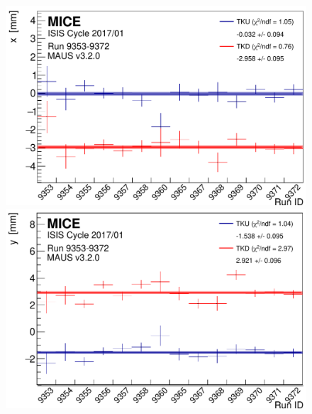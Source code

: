 \begin{figure}[htb]
  \begin{center}
    \begin{minipage}[b]{.45\textwidth}
      \begin{center}
        \includegraphics[width=\textwidth]{data_final/x_bestfit-edit.pdf}
      \end{center}
    \end{minipage}
    \hfill
    \begin{minipage}[b]{.45\textwidth}
      \begin{center}
        \includegraphics[width=\textwidth]{data_final/y_bestfit-edit.pdf}
      \end{center}
    \end{minipage}
    \begin{minipage}[b]{.45\textwidth}
      \begin{center}

\end{center}
\end{minipage}
\end{center}
\end{figure}
